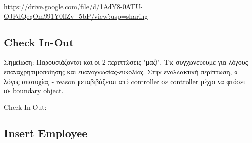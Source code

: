 \documentclass{article}
\begin{document}
\url{https://drive.google.com/file/d/1AdY8-0ATU-QJPdQeqOm991Y0flZv_5bP/view?usp=sharing}

\subsection{Check In-Out}

\noindent Σημείωση: Παρουσιάζονται και οι 2 περιπτώσεις "μαζί". Τις συγχωνεύουμε για λόγους επαναχρησιμοποίησης και ευαναγνωσίας-ευκολίας. Στην εναλλακτική περίπτωση, ο λόγος αποτυχίας - reason μεταβιβάζεται από controller σε controller μέχρι να φτάσει σε boundary object.

\noindent Check In-Out: \\
\noindent{}

\subsection{Insert Employee}
\noindent{}
\end{document}
